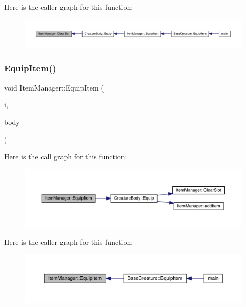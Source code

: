 Here is the caller graph for this function\+:
\nopagebreak
\begin{figure}[H]
\begin{center}
\leavevmode
\includegraphics[width=350pt]{dc/de1/class_item_manager_a2aa35a782e14a35ad9477c512e256303_icgraph}
\end{center}
\end{figure}
\mbox{\label{class_item_manager_a55d0009a402e2f5fc3a18cf0629cec64}} 
\subsubsection{\texorpdfstring{Equip\+Item()}{EquipItem()}}
{\footnotesize\ttfamily void Item\+Manager\+::\+Equip\+Item (\begin{DoxyParamCaption}\item[{int}]{i,  }\item[{\mbox{\hyperlink{class_creature_body}{Creature\+Body}} \&}]{body }\end{DoxyParamCaption})}

Here is the call graph for this function\+:
\nopagebreak
\begin{figure}[H]
\begin{center}
\leavevmode
\includegraphics[width=350pt]{dc/de1/class_item_manager_a55d0009a402e2f5fc3a18cf0629cec64_cgraph}
\end{center}
\end{figure}
Here is the caller graph for this function\+:
\nopagebreak
\begin{figure}[H]
\begin{center}
\leavevmode
\includegraphics[width=350pt]{dc/de1/class_item_manager_a55d0009a402e2f5fc3a18cf0629cec64_icgraph}
\end{center}
\end{figure}
\mbox{\label{class_item_manager_a2fc75a7db020109a6a11d6db7e56a791}} 
